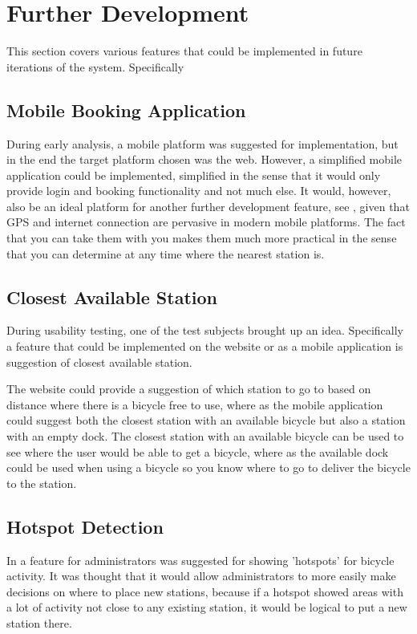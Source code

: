 \section{Further Development}
This section covers various features that could be implemented in future iterations of the system. Specifically

\subsection{Mobile Booking Application}
During early analysis, a mobile platform was suggested for implementation, but in the end the target platform chosen was the web. 
However, a simplified mobile application could be implemented, simplified in the sense that it would only provide login and booking functionality and not much else.
It would, however, also be an ideal platform for another further development feature, see , given that GPS and internet connection are pervasive in modern mobile platforms.
The fact that you can take them with you makes them much more practical in the sense that you can determine at any time where the nearest station is.

\subsection{Closest Available Station}\label{subsec:closeststation}
During usability testing, one of the test subjects brought up an idea.
Specifically a feature that could be implemented on the website or as a mobile application is suggestion of closest available station.

The website could provide a suggestion of which station to go to based on distance where there is a bicycle free to use, where as the mobile application could suggest both the closest station with an available bicycle but also a station with an empty dock.
The closest station with an available bicycle can be used to see where the user would be able to get a bicycle, where as the available dock could be used when using a bicycle so you know where to go to deliver the bicycle to the station.

\subsection{Hotspot Detection}
In  a feature for administrators was suggested for showing 'hotspots' for bicycle activity. 
It was thought that it would allow administrators to more easily make decisions on where to place new stations, because if a hotspot showed areas with a lot of activity not close to any existing station, it would be logical to put a new station there.

